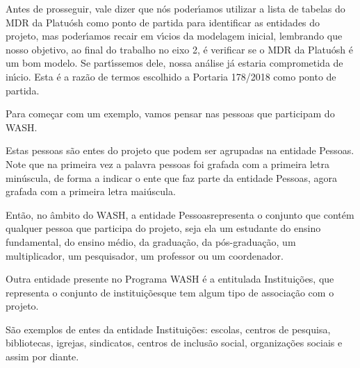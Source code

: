 \documentclass[
12pt,		%
openright,	%
twoside,  %
a4paper,			%
chapter=TITLE,		%
english,			%
french,				%
spanish,			%
brazil				%
]{USPSC-classe/USPSC}
\begin{document}
Antes de prosseguir, vale dizer que n\'os poder\'{\i}amos utilizar a lista de tabelas do MDR da Platu\'osh como ponto de partida para identificar as entidades do projeto, mas poder\'{\i}amos recair em v\'{\i}cios da modelagem inicial, lembrando que nosso objetivo, ao final do trabalho no eixo 2, \'e verificar se o MDR da Platu\'osh \'e um bom modelo. Se part\'{\i}ssemos dele, nossa an\'alise j\'a estaria comprometida de in\'{\i}cio. Esta \'e a raz\~ao de termos escolhido a Portaria 178/2018 como ponto de partida.









Para come\c{c}ar com um exemplo, vamos pensar nas \textquotedbl pessoas que participam do WASH\textquotedbl .









Estas pessoas s\~ao entes do projeto que podem ser agrupadas na entidade \textquotedbl Pessoas\textquotedbl . Note que na primeira vez a palavra pessoas foi grafada com a primeira letra min\'uscula, de forma a indicar o ente que faz parte da entidade \textquotedbl Pessoas\textquotedbl , agora grafada com a primeira letra mai\'uscula.









Ent\~ao, no \^ambito do WASH, a entidade \textquotedbl Pessoas\textquotedbl  representa o conjunto que cont\'em qualquer pessoa que participa do projeto, seja ela um estudante do ensino fundamental, do ensino m\'edio, da gradua\c{c}\~ao, da p\'os-gradua\c{c}\~ao, um multiplicador, um pesquisador, um professor ou um coordenador.









Outra entidade presente no Programa WASH \'e a entitulada \textquotedbl Institui\c{c}\~oes\textquotedbl , que representa o conjunto de \textquotedbl institui\c{c}\~oes\textquotedbl  que tem algum tipo de associa\c{c}\~ao com o projeto.









S\~ao exemplos de entes da entidade \textquotedbl Institui\c{c}\~oes\textquotedbl : escolas, centros de pesquisa, bibliotecas, igrejas, sindicatos, centros de inclus\~ao social, organiza\c{c}\~oes sociais e assim por diante.
\end{document}
